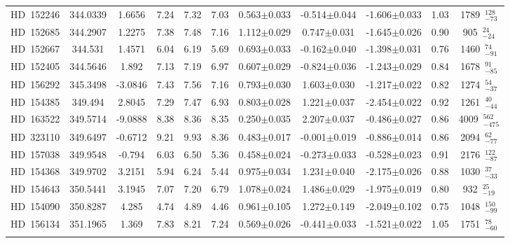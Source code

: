 {\begin{longtable}{lcccccccccc}
\noalign{\smallskip}
HD~152246 & 344.0339 & 1.6656 & 7.24 & 7.32 & 7.03 & 0.563$\pm$0.033 & -0.514$\pm$0.044 & -1.606$\pm$0.033 & 1.03 & 1789~$_{-73}^{128}$ \\
\noalign{\smallskip}
HD~152685 & 344.2907 & 1.2275 & 7.38 & 7.48 & 7.16 & 1.112$\pm$0.029 & 0.747$\pm$0.031 & -1.645$\pm$0.026 & 0.90 & 905~$_{-24}^{24}$ \\
\noalign{\smallskip}
HD~152667 & 344.531 & 1.4571 & 6.04 & 6.19 & 5.69 & 0.693$\pm$0.033 & -0.162$\pm$0.040 & -1.398$\pm$0.031 & 0.76 & 1460~$_{-91}^{74}$ \\
\noalign{\smallskip}
HD~152405 & 344.5646 & 1.892 & 7.13 & 7.19 & 6.97 & 0.607$\pm$0.029 & -0.824$\pm$0.036 & -1.243$\pm$0.029 & 0.84 & 1678~$_{-85}^{91}$ \\
\noalign{\smallskip}
HD~156292 & 345.3498 & -3.0846 & 7.43 & 7.56 & 7.16 & 0.793$\pm$0.030 & 1.603$\pm$0.030 & -1.217$\pm$0.022 & 0.82 & 1274~$_{-37}^{54}$ \\
\noalign{\smallskip}
HD~154385 & 349.494 & 2.8045 & 7.29 & 7.47 & 6.93 & 0.803$\pm$0.028 & 1.221$\pm$0.037 & -2.454$\pm$0.022 & 0.92 & 1261~$_{-44}^{40}$ \\
\noalign{\smallskip}
HD~163522 & 349.5714 & -9.0888 & 8.38 & 8.36 & 8.35 & 0.250$\pm$0.035 & 2.207$\pm$0.037 & -0.486$\pm$0.027 & 0.86 & 4009~$_{-475}^{562}$ \\
\noalign{\smallskip}
HD~323110 & 349.6497 & -0.6712 & 9.21 & 9.93 & 8.36 & 0.483$\pm$0.017 & -0.001$\pm$0.019 & -0.886$\pm$0.014 & 0.86 & 2094~$_{-77}^{62}$ \\
\noalign{\smallskip}
HD~157038 & 349.9548 & -0.794 & 6.03 & 6.50 & 5.36 & 0.458$\pm$0.024 & -0.273$\pm$0.033 & -0.528$\pm$0.023 & 0.91 & 2176~$_{-87}^{122}$ \\
\noalign{\smallskip}
HD~154368 & 349.9702 & 3.2151 & 5.94 & 6.24 & 5.44 & 0.975$\pm$0.034 & 1.231$\pm$0.040 & -2.175$\pm$0.026 & 0.88 & 1030~$_{-33}^{37}$ \\
\noalign{\smallskip}
HD~154643 & 350.5441 & 3.1945 & 7.07 & 7.20 & 6.79 & 1.078$\pm$0.024 & 1.486$\pm$0.029 & -1.975$\pm$0.019 & 0.80 & 932~$_{-19}^{25}$ \\
\noalign{\smallskip}
HD~154090 & 350.8287 & 4.285 & 4.74 & 4.89 & 4.46 & 0.961$\pm$0.105 & 1.272$\pm$0.149 & -2.049$\pm$0.102 & 0.75 & 1048~$_{-99}^{150}$ \\
\noalign{\smallskip}
HD~156134 & 351.1965 & 1.369 & 7.83 & 8.21 & 7.24 & 0.569$\pm$0.026 & -0.441$\pm$0.033 & -1.521$\pm$0.022 & 1.05 & 1751~$_{-60}^{78}$ \\
\noalign{\smallskip}

\end{longtable}}
